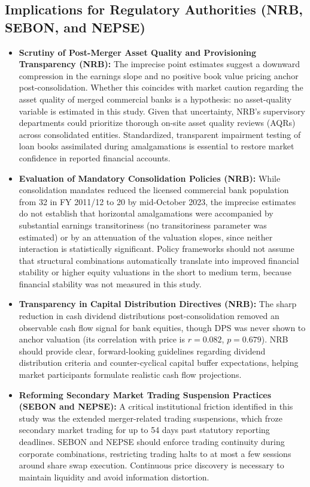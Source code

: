 \subsection{Implications for Regulatory Authorities (NRB, SEBON, and NEPSE)}
\begin{itemize}
    \item \textbf{Scrutiny of Post-Merger Asset Quality and Provisioning Transparency (NRB):}
    The imprecise point estimates suggest a downward compression in the earnings slope and no positive book value pricing anchor post-consolidation. Whether this coincides with market caution regarding the asset quality of merged commercial banks is a hypothesis: no asset-quality variable is estimated in this study. Given that uncertainty, NRB's supervisory departments could prioritize thorough on-site asset quality reviews (AQRs) across consolidated entities. Standardized, transparent impairment testing of loan books assimilated during amalgamations is essential to restore market confidence in reported financial accounts.
    \item \textbf{Evaluation of Mandatory Consolidation Policies (NRB):}
    While consolidation mandates reduced the licensed commercial bank population from 32 in FY 2011/12 to 20 by mid-October 2023, the imprecise estimates do not establish that horizontal amalgamations were accompanied by substantial earnings transitoriness (no transitoriness parameter was estimated) or by an attenuation of the valuation slopes, since neither interaction is statistically significant. Policy frameworks should not assume that structural combinations automatically translate into improved financial stability or higher equity valuations in the short to medium term, because financial stability was not measured in this study.
    \item \textbf{Transparency in Capital Distribution Directives (NRB):}
    The sharp reduction in cash dividend distributions post-consolidation removed an observable cash flow signal for bank equities, though DPS was never shown to anchor valuation (its correlation with price is $r = 0.082$, $p = 0.679$). NRB should provide clear, forward-looking guidelines regarding dividend distribution criteria and counter-cyclical capital buffer expectations, helping market participants formulate realistic cash flow projections.
    \item \textbf{Reforming Secondary Market Trading Suspension Practices (SEBON and NEPSE):}
    A critical institutional friction identified in this study was the extended merger-related trading suspensions, which froze secondary market trading for up to 54 days past statutory reporting deadlines. SEBON and NEPSE should enforce trading continuity during corporate combinations, restricting trading halts to at most a few sessions around share swap execution. Continuous price discovery is necessary to maintain liquidity and avoid information distortion.

\end{itemize}
